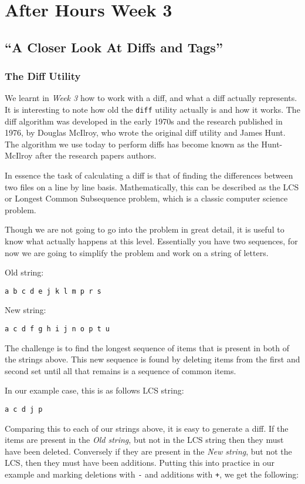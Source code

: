 \chapter{After Hours Week 3}
\section{``A Closer Look At Diffs and Tags''}
\subsection{The Diff Utility}
We learnt in \emph{Week 3} how to work with a diff, and what a diff actually represents.  It is interesting to note how old the \texttt{diff} utility actually is and how it works.  The diff algorithm was developed in the early 1970s and the research published in 1976, by Douglas McIlroy, who wrote the original diff utility and James Hunt.  The algorithm we use today to perform diffs has become known as the Hunt-McIlroy after the research papers authors.

In essence the task of calculating a diff is that of finding the differences between two files on a line by line basis.  Mathematically, this can be described as the LCS or Longest Common Subsequence problem, which is a classic computer science problem.  

Though we are not going to go into the problem in great detail, it is useful to know what actually happens at this level.  Essentially you have two sequences, for now we are going to simplify the problem and work on a string of letters.

Old string: 
\begin{Verbatim}
a b c d e j k l m p r s
\end{Verbatim}

New string: 
\begin{Verbatim}
a c d f g h i j n o p t u
\end{Verbatim}

The challenge is to find the longest sequence of items that is present in both of the strings above.  This new sequence is found by deleting items from the first and second set until all that remains is a sequence of common items.  

In our example case, this is as follows
LCS string: 
\begin{Verbatim}
a c d j p
\end{Verbatim}

Comparing this to each of our strings above, it is easy to generate a diff.  If the items are present in the \emph{Old string}, but not in the LCS string then they must have been deleted.  Conversely if they are present in the \emph{New string}, but not the LCS, then they must have been additions.  Putting this into practice in our example and marking deletions with \texttt{-} and additions with \texttt{+}, we get the following:


